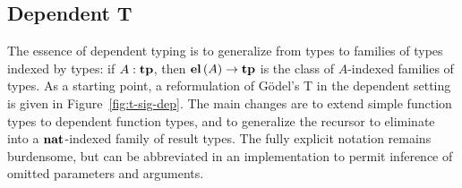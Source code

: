 \documentclass[11pt,twoside]{article}
\newcommand{\const}[1]{\textbf{#1}}
\newcommand{\arrclass}[2]{{#1}\to{#2}}
\newcommand{\appobj}[2]{{#1}\,{#2}}
\begin{document}
\subsection{Dependent T}

The essence of dependent typing is to generalize from types to families of types indexed
by types: if $A:\tpsort$, then $\arrclass{\elofp{A}}{\tpsort}$ is the class of $A$-indexed
families of types.  As a starting point, a reformulation of G\"odel's T in the dependent
setting is given in Figure~\ref{fig:t-sig-dep}.  The main changes are to extend simple
function types to dependent function types, and to generalize the recursor to eliminate
into a $\nattp$-indexed family of result types.  The fully explicit notation remains
burdensome, but can be abbreviated in an implementation to permit inference of omitted
parameters and arguments.

\newcommand{\pitp}{\const{pi}}
\newcommand{\piof}[2]{\appobj{\appobj{\pitp}{#1}}{#2}}
\end{document}
